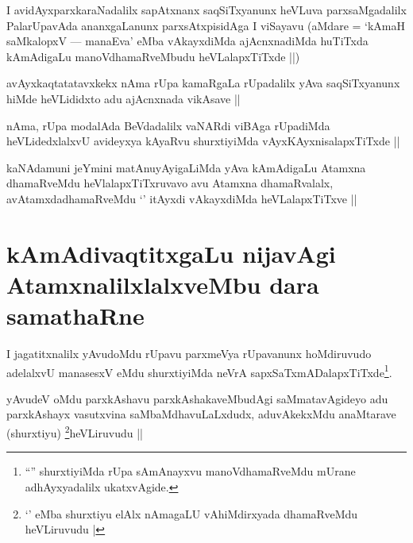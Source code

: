 \begin{artha}
I avidAyxparxkaraNadalilx sapAtxnanx saqSiTxyanunx heVLuva
parxsaMgadalilx PalarUpavAda ananxgaLanunx parxsAtxpisidAga I viSayavu
(aMdare = `kAmaH saMkalopxV --- manaEva' eMba vAkayxdiMda
ajAcnxnadiMda huTiTxda kAmAdigaLu manoVdhamaRveMbudu heVLalapxTiTxde ||)
\end{artha}


\begin{artha}
avAyxkaqtatatavxkekx nAma rUpa kamaRgaLa rUpadalilx yAva saqSiTxyanunx
hiMde heVLididxto adu ajAcnxnada vikAsave ||
\end{artha}


\begin{artha}
nAma, rUpa modalAda BeVdadalilx vaNARdi viBAga rUpadiMda
heVLidedxlalxvU avideyxya kAyaRvu shurxtiyiMda vAyxKAyxnisalapxTiTxde ||
\end{artha}


\begin{artha}
kaNAdamuni jeYmini matAnuyAyigaLiMda yAva kAmAdigaLu Atamxna
dhamaRveMdu heVlalapxTiTxruvavo avu Atamxna dhamaRvalalx,
avAtamxdadhamaRveMdu `\stext' itAyxdi vAkayxdiMda heVLalapxTiTxve ||
\end{artha}

\section*{kAmAdivaqtitxgaLu nijavAgi AtamxnalilxlalxveMbu dara samathaRne}


\begin{artha}
I jagatitxnalilx yAvudoMdu rUpavu parxmeVya rUpavanunx hoMdiruvudo
adelalxvU manasesxV eMdu shurxtiyiMda neVrA
sapxSaTxmADalapxTiTxde\footnote{``\stext'' shurxtiyiMda rUpa
  sAmAnayxvu manoVdhamaRveMdu mUrane adhAyxyadalilx ukatxvAgide.}.
\end{artha}

\begin{artha}
yAvudeV oMdu parxkAshavu parxkAshakaveMbudAgi saMmatavAgideyo adu
parxkAshayx vasutxvina saMbaMdhavuLaLxdudx, aduvAkekxMdu anaMtarave
(shurxtiyu) \footnote{`\stext' eMba shurxtiyu elAlx nAmagaLU
  vAhiMdirxyada dhamaRveMdu heVLiruvudu |}heVLiruvudu ||
\end{artha}

